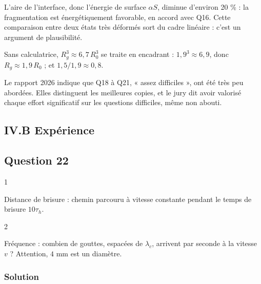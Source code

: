 \documentclass[11pt,a4paper]{article}
\newcommand{\equationajustee}[1]{%
  \sbox{\boiteequation}{$\displaystyle #1$}%
  \ifdim\wd\boiteequation>\linewidth
    \[\resizebox{\linewidth}{!}{\usebox{\boiteequation}}\]%
  \else
    \[#1\]%
  \fi}
\begin{document}
\equationajustee{\boxed{\frac{S_{\rm sph}}{S_{\rm cyl}}=\frac{3R_0}{2R_g}\approx0{,}8}}

L'aire de l'interface, donc l'énergie de surface \(\alpha S\), diminue d'environ 20 \% : la fragmentation est énergétiquement favorable, en accord avec Q16. Cette comparaison entre deux états très déformés sort du cadre linéaire : c'est un argument de plausibilité.

\begin{methode}

Sans calculatrice, \(R_g^3\approx6{,}7\,R_0^3\) se traite en encadrant : \(1{,}9^3\approx6{,}9\), donc \(R_g\approx1{,}9\,R_0\) ; et \(1{,}5/1{,}9\approx0{,}8\).

\end{methode}

\begin{jury}

Le rapport 2026 indique que Q18 à Q21, « assez difficiles », ont été très peu abordées. Elles distinguent les meilleures copies, et le jury dit avoir valorisé chaque effort significatif sur les questions difficiles, même non abouti.

\end{jury}

\hypertarget{iv.b-expuxe9rience}{%
\subsection{IV.B Expérience}\label{iv.b-expuxe9rience}}

\hypertarget{question-22}{%
\subsection{Question 22}\label{question-22}}

\begin{indication}{1}

Distance de brisure : chemin parcouru à vitesse constante pendant le temps de brisure \(10\tau_h\).

\end{indication}

\begin{indication}{2}

Fréquence : combien de gouttes, espacées de \(\lambda_c\), arrivent par seconde à la vitesse \(v\) ? Attention, \(4\) mm est un diamètre.

\end{indication}

\hypertarget{solution-21}{%
\subsubsection{Solution}\label{solution-21}}
\end{document}
